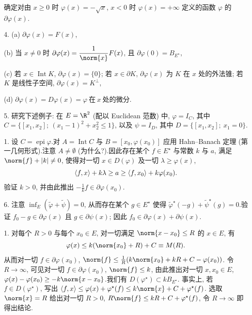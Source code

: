 
确定对由 $x\ge0$ 时 $\varphi(x)=-\sqrt{x}$, $x<0$ 时 $\varphi(x)=+\infty$ 定义的函数
$\varphi$ 的 $\partial\varphi(x)$.


4. (a) $\partial\varphi(x)=F(x)$,

(b) 当 $x\ne0$ 时 $\partial\varphi(x)=\dfrac{1}{\norm{x}}F(x)$, 且 $\partial\varphi(0)=B_{E^\star}$,

(c) 若 $x\in\operatorname{Int}K$, $\partial\varphi(x)=\{0\}$; 若 $x\in\partial K$,
$\partial\varphi(x)$ 为 $K$ 在 $x$ 处的外法锥; 若 $K$ 是线性子空间, $\partial\varphi(x)=K^\perp$,

(d) $\partial\varphi(x)=D\varphi(x)=\varphi\ \text{在}\ x\ \text{处的微分}$.

5. 研究下述例子: 在 $E=\R^2$ (配以 Euclidean 范数) 中, $\varphi=I_C$, 其中
$C=\{[x_1,x_2];\ (x_1-1)^2+x_2^2\le1\}$, 以及 $\psi=I_D$, 其中 $D=\{[x_1,x_2];\ x_1=0\}$.


1. 设 $C=\operatorname{epi}\varphi$.对 $A=\operatorname{Int}C$ 与 $B=[x_0,\varphi(x_0)]$
应用 Hahn--Banach 定理 (第一几何形式).注意 $A\ne\emptyset$ (为什么?).因此存在某个
$f\in E^\star$ 与常数 $k$ 与 $a$, 满足 $\norm{f}+\abs{k}\ne0$, 使得对一切 $x\in D(\varphi)$
及一切 $\lambda\ge\varphi(x)$,
\begin{equation*}
\left\langle f,x\right\rangle+k\lambda\ge a\ge\left\langle f,x_0\right\rangle+k\varphi(x_0).
\end{equation*}
验证 $k>0$, 并由此推出 $-\frac1kf\in\partial\varphi(x_0)$.

6. 注意 $\inf_E(\tilde\varphi+\tilde\psi)=0$, 从而存在某个 $g\in E^\star$ 使得
$\tilde\varphi^\star(-g)+\tilde\psi^\star(g)=0$.验证 $f_0-g\in\partial\varphi(x)$ 且
$g\in\partial\psi(x)$; 因此 $f_0\in\partial\varphi(x)+\partial\psi(x)$.


1. 对每个 $R>0$ 与每个 $x_0\in E$, 对一切满足 $\norm{x-x_0}\le R$ 的 $x\in E$, 有
\begin{equation*}
\varphi(x)\le k(\norm{x_0}+R)+C\equiv M(R).
\end{equation*}
从而对一切 $f\in\partial\varphi(x_0)$, $\norm{f}\le\frac1R(k\norm{x_0}+kR+C-\varphi(x_0))$.
令 $R\to\infty$, 可见对一切 $f\in\partial\varphi(x_0)$, $\norm{f}\le k$, 由此推出对一切
$x,x_0\in E$, $\varphi(x)-\varphi(x_0)\ge-k\norm{x-x_0}$.我们有 $D(\varphi^\star)\subset kB_{E^\star}$.
事实上, 若 $f\in D(\varphi^\star)$, 写出 $\dual{f}{x}\le\varphi(x)+\varphi^\star(f)\le k\norm{x}+C+\varphi^\star(f)$.
选取 $\norm{x}=R$ 给出对一切 $R>0$, $R\norm{f}\le kR+C+\varphi^\star(f)$, 令 $R\to\infty$
即得出结论.


